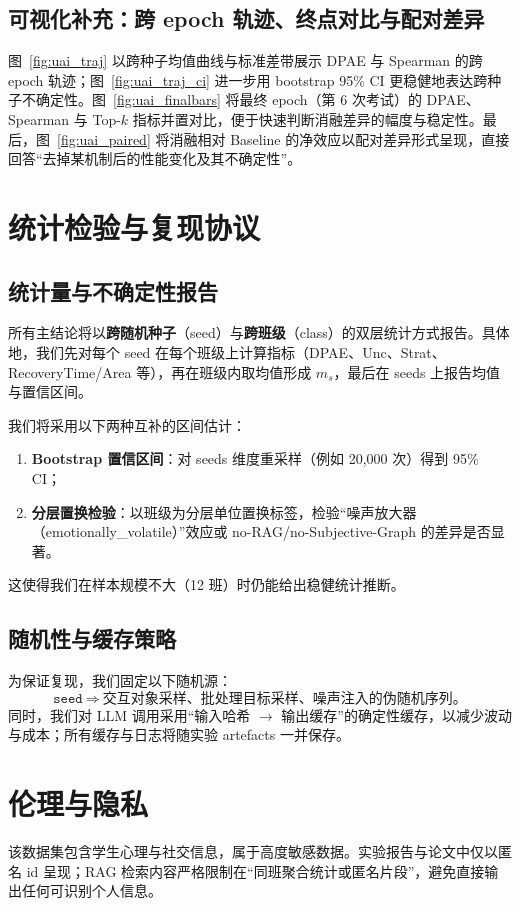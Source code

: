\documentclass[UTF8, a4paper, 11pt]{ctexart}
\begin{document}
\subsection{可视化补充：跨 epoch 轨迹、终点对比与配对差异}
图~\ref{fig:uai_traj} 以跨种子均值曲线与标准差带展示 DPAE 与 Spearman 的跨 epoch 轨迹；图~\ref{fig:uai_traj_ci} 进一步用 bootstrap 95\% CI 更稳健地表达跨种子不确定性。图~\ref{fig:uai_finalbars} 将最终 epoch（第 6 次考试）的 DPAE、Spearman 与 Top-$k$ 指标并置对比，便于快速判断消融差异的幅度与稳定性。最后，图~\ref{fig:uai_paired} 将消融相对 Baseline 的净效应以配对差异形式呈现，直接回答“去掉某机制后的性能变化及其不确定性”。
\FloatBarrier

\section{统计检验与复现协议}
\subsection{统计量与不确定性报告}
所有主结论将以\textbf{跨随机种子}（seed）与\textbf{跨班级}（class）的双层统计方式报告。具体地，我们先对每个 seed 在每个班级上计算指标（DPAE、Unc、Strat、RecoveryTime/Area 等），再在班级内取均值形成 \(\hat{m}_s\)，最后在 seeds 上报告均值与置信区间。

我们将采用以下两种互补的区间估计：
\begin{enumerate}
    \item \textbf{Bootstrap 置信区间}：对 seeds 维度重采样（例如 20,000 次）得到 95\% CI；
    \item \textbf{分层置换检验}：以班级为分层单位置换标签，检验“噪声放大器（emotionally\_volatile）”效应或 no-RAG/no-Subjective-Graph 的差异是否显著。
\end{enumerate}
这使得我们在样本规模不大（12 班）时仍能给出稳健统计推断。

\subsection{随机性与缓存策略}
为保证复现，我们固定以下随机源：
\[
\texttt{seed}\ \Rightarrow\ \text{交互对象采样、批处理目标采样、噪声注入的伪随机序列。}
\]
同时，我们对 LLM 调用采用“输入哈希 \(\to\) 输出缓存”的确定性缓存，以减少波动与成本；所有缓存与日志将随实验 artefacts 一并保存。

\section{伦理与隐私}
该数据集包含学生心理与社交信息，属于高度敏感数据。实验报告与论文中仅以匿名 id 呈现；RAG 检索内容严格限制在“同班聚合统计或匿名片段”，避免直接输出任何可识别个人信息。
\end{document}
